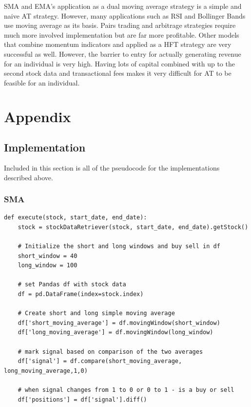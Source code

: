 \documentclass[letterpaper,11pt]{article}
\begin{document}
SMA and EMA's application as a dual moving average strategy is a simple and naive AT strategy. However, many applications such as RSI and Bollinger Bands use moving average as its basis. Pairs trading and arbitrage strategies require much more involved implementation but are far more profitable. Other models that combine momentum indicators and applied as a HFT strategy are very successful as well. However, the barrier to entry for actually generating revenue for an individual is very high. Having lots of capital combined with up to the second stock data and transactional fees makes it very difficult for AT to be feasible for an individual. 

\section{Appendix}

\subsection{Implementation}

Included in this section is all of the pseudocode for the implementations described above.

\subsubsection{SMA}

\begin{verbatim}
def execute(stock, start_date, end_date):
    stock = stockDataRetriever(stock, start_date, end_date).getStock()

    # Initialize the short and long windows and buy sell in df
    short_window = 40
    long_window = 100
    
    # set Pandas df with stock data
    df = pd.DataFrame(index=stock.index)

    # Create short and long simple moving average 
    df['short_moving_average'] = df.movingWindow(short_window)
    df['long_moving_average'] = df.movingWindow(long_window)
    
    # mark signal based on comparison of the two averages
    df['signal'] = df.compare(short_moving_average, long_moving_average,1,0)
    
    # when signal changes from 1 to 0 or 0 to 1 - is a buy or sell
    df['positions'] = df['signal'].diff()

\end{verbatim}
\end{document}
